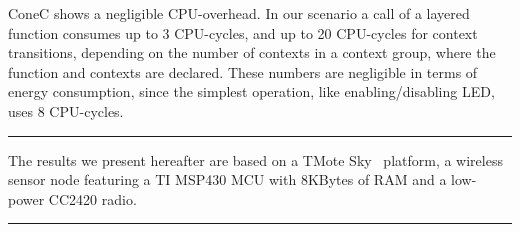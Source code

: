 
ConeC shows a negligible CPU-overhead. In our scenario a call of a layered
function consumes up to 3 CPU-cycles, and up to 20 CPU-cycles for context
transitions, depending on the number of contexts in a context group, where the
function and contexts are declared. These numbers are negligible in terms of
energy consumption, since the simplest operation, like enabling/disabling LED,
uses 8 CPU-cycles.

\hrule
The results we present hereafter are based on a TMote
Sky~\cite{} platform, a wireless sensor node featuring a TI MSP430 MCU
with 8KBytes of RAM and a low-power CC2420 radio.
\hrule

